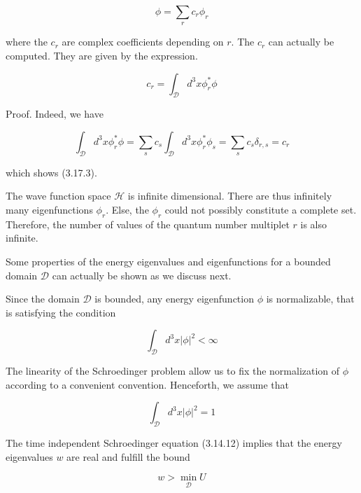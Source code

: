 \documentclass{article}
\begin{document}
\begin{equation*}
\phi=\sum_{r} c_{r} \phi_{r} \tag{3.17.2}
\end{equation*}
 
where the $c_{r}$ are complex coefficients depending on $r$. The $c_{r}$ can actually be computed. They are given by the expression.
 
\begin{equation*}
c_{r}=\int_{\mathcal{D}} d^{3} x \phi_{r}^{*} \phi \tag{3.17.3}
\end{equation*}
 

Proof. Indeed, we have
 
\begin{equation*}
\int_{\mathcal{D}} d^{3} x \phi_{r}^{*} \phi=\sum_{s} c_{s} \int_{\mathcal{D}} d^{3} x \phi_{r}^{*} \phi_{s}=\sum_{s} c_{s} \delta_{r, s}=c_{r} \tag{3.17.4}
\end{equation*}
 
which shows (3.17.3).

The wave function space $\mathcal{H}$ is infinite dimensional. There are thus infinitely many eigenfunctions $\phi_{r}$. Else, the $\phi_{r}$ could not possibly constitute a complete set. Therefore, the number of values of the quantum number multiplet $r$ is also infinite.

Some properties of the energy eigenvalues and eigenfunctions for a bounded domain $\mathcal{D}$ can actually be shown as we discuss next.

Since the domain $\mathcal{D}$ is bounded, any energy eigenfunction $\phi$ is normalizable, that is satisfying the condition
 
\begin{equation*}
\int_{\mathcal{D}} d^{3} x|\phi|^{2}<\infty \tag{3.17.5}
\end{equation*}
 

The linearity of the Schroedinger problem allow us to fix the normalization of $\phi$ according to a convenient convention. Henceforth, we assume that
 
\begin{equation*}
\int_{\mathcal{D}} d^{3} x|\phi|^{2}=1 \tag{3.17.6}
\end{equation*}
 

The time independent Schroedinger equation (3.14.12) implies that the energy eigenvalues $w$ are real and fulfill the bound
 
\begin{equation*}
w>\min _{\mathcal{D}} U \tag{3.17.7}
\end{equation*}
 
\end{document}
